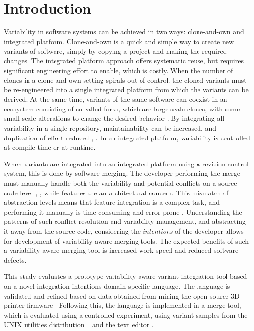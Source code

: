 \chapter{Introduction}
Variability in software systems can be achieved in two ways: clone-and-own and integrated platform. Clone-and-own is a quick and simple way to create new variants of software, simply by copying a project and making the required changes. The integrated platform approach offers systematic reuse, but requires significant engineering effort to enable, which is costly. When the number of clones in a clone-and-own setting spirals out of control, the cloned variants must be re-engineered into a single integrated platform from which the variants can be derived. At the same time, variants of the same software can coexist in an ecosystem consisting of so-called forks, which are large-scale clones, with some small-scale alterations to change the desired behavior \cite{stanciulescu2015}. By integrating all variability in a single repository, maintainability can be increased, and duplication of effort reduced \cite{schmorleiz2016similarity}, \cite{stanciulescu2015}. In an integrated platform, variability is controlled at compile-time or at runtime.

When variants are integrated into an integrated platform using a revision control system, this is done by software merging. The developer performing the merge must manually handle both the variability and potential conflicts on a source code level \cite{mens2002}, \cite{apel2011}, while features are an architectural concern. This mismatch of abstraction levels means that feature integration is a complex task, and performing it manually is time-consuming and error-prone \cite{melo2016latin}. Understanding the patterns of such conflict resolution and variability management, and abstracting it away from the source code, considering the \textit{intentions} of the developer allows for development of variability-aware merging tools. The expected benefits of such a variability-aware merging tool is increased work speed and reduced software defects.

This study evaluates a prototype variability-aware variant integration tool based on a novel integration intentions domain specific language.
The language is validated and refined based on data obtained from mining the open-source 3D-printer firmware \marlin. Following this, the language is implemented in a merge tool, which is evaluated using a controlled experiment, using variant samples from the UNIX utilities distribution \busybox~ and the text editor \vim.

